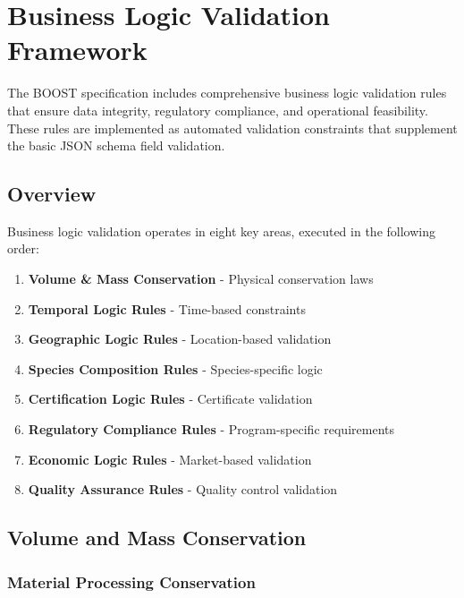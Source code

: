 
\section{Business Logic Validation Framework}
\label{sec:business-logic-validation}

The BOOST specification includes comprehensive business logic validation rules that ensure data integrity, regulatory compliance, and operational feasibility. These rules are implemented as automated validation constraints that supplement the basic JSON schema field validation.

\subsection{Overview}
\label{sec:business-logic-overview}

Business logic validation operates in eight key areas, executed in the following order:
\begin{enumerate}
    \item \textbf{Volume \& Mass Conservation} - Physical conservation laws
    \item \textbf{Temporal Logic Rules} - Time-based constraints
    \item \textbf{Geographic Logic Rules} - Location-based validation
    \item \textbf{Species Composition Rules} - Species-specific logic
    \item \textbf{Certification Logic Rules} - Certificate validation
    \item \textbf{Regulatory Compliance Rules} - Program-specific requirements
    \item \textbf{Economic Logic Rules} - Market-based validation
    \item \textbf{Quality Assurance Rules} - Quality control validation
\end{enumerate}

\subsection{Volume and Mass Conservation}
\label{sec:volume-mass-conservation}

\subsubsection{Material Processing Conservation}

